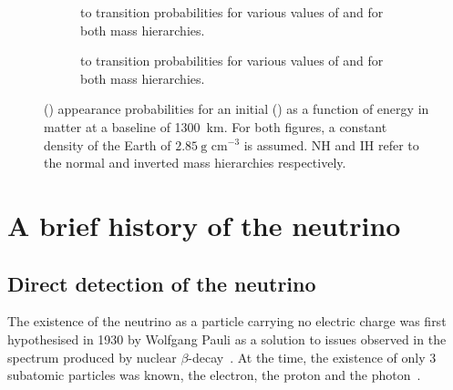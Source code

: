 \begin{figure}[h]
  \centering
  \begin{subfigure}[t]{0.49\textwidth}
    \begin{adjustbox}{max totalsize={\textwidth}, center}
      
    \end{adjustbox}
    \caption{\numu to \nue transition probabilities for various values of \dcp and for both mass hierarchies.}
  \end{subfigure}
  \hfill
  \begin{subfigure}[t]{0.49\textwidth}
    \begin{adjustbox}{max totalsize={\textwidth}, center}
      
    \end{adjustbox}
    \caption{\anumu to \anue transition probabilities for various values of \dcp and for both mass hierarchies.}
  \end{subfigure}
  \caption[\nue and \anue appearance probabilities in matter.]{\nue(\anue) appearance probabilities for an initial \numu(\anumu) as a function of energy in matter at a baseline of 1300~km. For both figures, a constant density of the Earth of $2.85~\text{g~cm}^{-3}$ is assumed. NH and IH refer to the normal and inverted mass hierarchies respectively.}
  \label{fig:threeNuMatter}
\end{figure}

\section{A brief history of the neutrino}
\label{sec:theory:history}

\subsection{Direct detection of the neutrino}
\label{sec:theory:history:detection}

The existence of the neutrino as a particle carrying no electric charge was first hypothesised in 1930 by Wolfgang Pauli as a solution to issues observed in the spectrum produced by nuclear $\beta$-decay~\cite{pauliNeutrino}.
At the time, the existence of only 3 subatomic particles was known, the electron, the proton and the photon~\cite{ideaOfNeutrino}.
 
